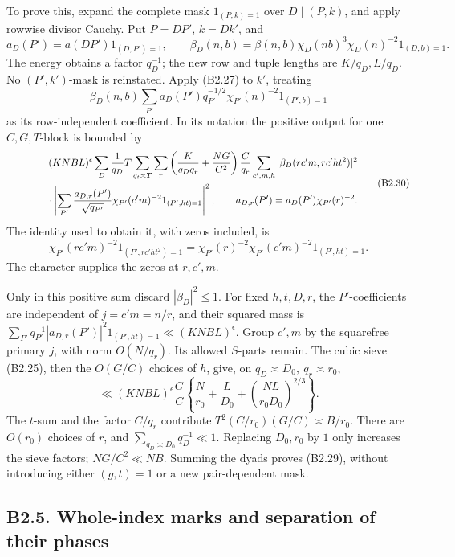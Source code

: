 \documentclass[11pt,a4paper]{article}
\begin{document}
To prove this, expand the complete mask \(1_{(P,\allowbreak{}k)=1}\) over
\(D\mid(P,\allowbreak{}k)\), and apply rowwise divisor Cauchy. Put \(P=DP'\),
\(k=Dk'\), and \[
a_D(P')=a(DP')1_{(D,P')=1},\qquad
\beta_D(n,b)=\beta(n,b)\chi_D(nb)^3\chi_D(n)^{-2}1_{(D,b)=1}.
\] The energy obtains a factor \(q_D^{-1}\); the new row and tuple
lengths are \(K/q_D,\allowbreak{}L/q_D\). No \((P',\allowbreak{}k')\)-mask is reinstated. Apply
(B2.27) to \(k'\), treating \[
\beta_D(n,b)\sum_{P'}a_D(P')q_{P'}^{-1/2}
\chi_{P'}(n)^{-2}1_{(P',b)=1}
\] as its row-independent coefficient. In its notation the positive
output for one \(C,\allowbreak{}G,\allowbreak{}T\)-block is bounded by \[
\begin{aligned}
(KNBL)^\epsilon
\sum_D\frac1{q_D}T\sum_{q_t\asymp T}\sum_r
\left(\frac K{q_Dq_r}+\frac{NG}{C^2}\right)\frac C{q_r}
\sum_{c',m,h}|\beta_D(rc'm,rc'ht^2)|^2\\
\hspace{15mm}\cdot
\left|\sum_{P'}\frac{a_{D,r}(P')}{\sqrt{q_{P'}}}
\chi_{P'}(c'm)^{-2}1_{(P',ht)=1}\right|^2,
\qquad a_{D,r}(P')=a_D(P')\chi_{P'}(r)^{-2}.
\end{aligned}
\tag{B2.30}
\] The identity used to obtain it, with zeros included, is \[
\chi_{P'}(rc'm)^{-2}1_{(P',rc'ht^2)=1}
=\chi_{P'}(r)^{-2}\chi_{P'}(c'm)^{-2}1_{(P',ht)=1}.
\] The character supplies the zeros at \(r,\allowbreak{}c',\allowbreak{}m\).

Only in this positive sum discard \(|\beta_D|^2\le1\). For fixed
\(h,\allowbreak{}t,\allowbreak{}D,\allowbreak{}r\), the \(P'\)-coefficients are independent of \(j=c'm=n/r\),
and their squared mass is
\(\sum_{P'}q_{P'}^{-1}|a_{D,\allowbreak{}r}(P')|^2 1_{(P',\allowbreak{}ht)=1}\ll(KNBL)^\epsilon\).
Group \(c',\allowbreak{}m\) by the squarefree primary \(j\), with norm \(O(N/q_r)\).
Its allowed \(S\)-parts remain. The cubic sieve (B2.25), then the
\(O(G/C)\) choices of \(h\), give, on \(q_D\asymp D_0,\allowbreak{}\ q_r\asymp r_0\),
\[
\ll(KNBL)^\epsilon\frac GC
\left\{\frac N{r_0}+\frac L{D_0}+
\left(\frac{NL}{r_0D_0}\right)^{2/3}\right\}.
\] The \(t\)-sum and the factor \(C/q_r\) contribute
\(T^2(C/r_0)(G/C)\asymp B/r_0\). There are \(O(r_0)\) choices of \(r\),
and \(\sum_{q_D\asymp D_0}q_D^{-1}\ll1\). Replacing \(D_0,\allowbreak{}r_0\) by \(1\)
only increases the sieve factors; \(NG/C^2\ll NB\). Summing the dyads
proves (B2.29), without introducing either \((g,\allowbreak{}t)=1\) or a new
pair-dependent mask.

\hypertarget{b2.5.-whole-index-marks-and-separation-of-their-phases}{%
\subsection{B2.5. Whole-index marks and separation of their
phases}\label{b2.5.-whole-index-marks-and-separation-of-their-phases}}
\end{document}
